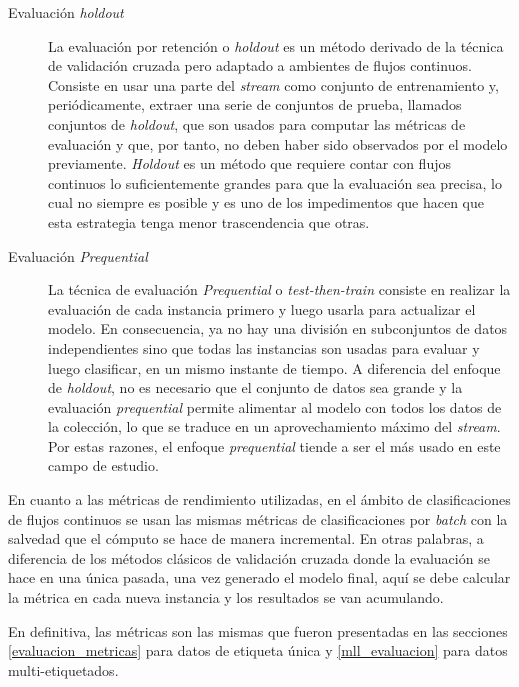 \begin{description}

	\item[Evaluación \textit{holdout}] La evaluación por retención o
	      \textit{holdout} es un método derivado de la técnica de validación cruzada
	      pero adaptado a ambientes de flujos continuos. Consiste en usar una parte
	      del \textit{stream} como conjunto de entrenamiento y, periódicamente,
	      extraer una serie de conjuntos de prueba, llamados conjuntos de
	      \textit{holdout}, que son usados para computar las métricas de evaluación
	      y que, por tanto, no deben haber sido observados por el modelo
	      previamente.  \textit{Holdout} es un método que requiere contar con flujos
	      continuos lo suficientemente grandes para que la evaluación sea precisa,
	      lo cual no siempre es posible y es uno de los impedimentos que hacen que
	      esta estrategia tenga menor trascendencia que otras.

	\item[Evaluación \textit{Prequential}] La técnica de evaluación
	      \textit{Prequential} o \textit{test-then-train} consiste en realizar la
	      evaluación de cada instancia primero y luego usarla para actualizar el
	      modelo. En consecuencia, ya no hay una división en subconjuntos de datos
	      independientes sino que todas las instancias son usadas para evaluar y
	      luego clasificar, en un mismo instante de tiempo. A diferencia del enfoque
	      de \textit{holdout}, no es necesario que el conjunto de datos sea grande y
	      la evaluación \textit{prequential} permite alimentar al modelo con todos
	      los datos de la colección, lo que se traduce en un aprovechamiento máximo
	      del \textit{stream}. Por estas razones, el enfoque \textit{prequential}
	      tiende a ser el más usado en este campo de estudio.

\end{description}

En cuanto a las métricas de rendimiento utilizadas, en el ámbito de
clasificaciones de flujos continuos se usan las mismas métricas de
clasificaciones por \textit{batch} con la salvedad que el cómputo se hace de
manera incremental. En otras palabras, a diferencia de los métodos clásicos de
validación cruzada donde la evaluación se hace en una única pasada, una vez
generado el modelo final, aquí se debe calcular la métrica en cada nueva
instancia y los resultados se van acumulando.

En definitiva, las métricas son las mismas que fueron presentadas en las
secciones \ref{evaluacion_metricas} para datos de etiqueta única y
\ref{mll_evaluacion} para datos multi-etiquetados.


